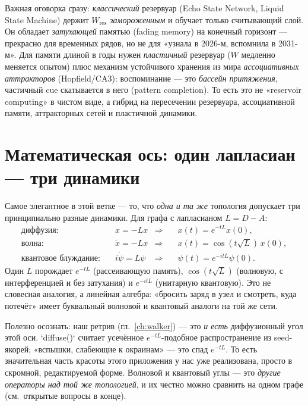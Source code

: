 Важная оговорка сразу: \emph{классический} резервуар (Echo State Network, Liquid State
Machine) держит $W_{\text{res}}$ \emph{замороженным} и обучает только считывающий слой. Он
обладает \emph{затухающей} памятью (fading memory) на конечный горизонт — прекрасно для
временных рядов, но не для «узнала в 2026-м, вспомнила в 2031-м». Для памяти длиной в годы
нужен \emph{пластичный} резервуар ($W$ медленно меняется опытом) плюс механизм устойчивого
хранения из мира \emph{ассоциативных аттракторов} (Hopfield/CA3): воспоминание — это
\emph{бассейн притяжения}, частичный cue скатывается в него (pattern completion). То есть это
не «reservoir computing» в чистом виде, а гибрид на пересечении резервуара, ассоциативной
памяти, аттракторных сетей и пластичной динамики.

\section{Математическая ось: один лапласиан — три динамики}

Самое элегантное в этой ветке — то, что \emph{одна и та же} топология допускает три
принципиально разные динамики. Для графа с лапласианом $L=D-A$:
\begin{align}
\text{диффузия:}\quad & \dot x = -Lx & \Rightarrow\quad & x(t)=e^{-tL}x(0),\\
\text{волна:}\quad & \ddot x = -Lx & \Rightarrow\quad & x(t)=\cos(t\sqrt{L})\,x(0),\\
\text{квантовое блуждание:}\quad & i\dot\psi = L\psi & \Rightarrow\quad & \psi(t)=e^{-itL}\psi(0).
\end{align}
Один $L$ порождает $e^{-tL}$ (рассеивающую память), $\cos(t\sqrt L)$ (волновую, с
интерференцией и без затухания) и $e^{-itL}$ (унитарную квантовую). Это не словесная
аналогия, а линейная алгебра: «бросить заряд в узел и смотреть, куда потечёт» имеет буквальный
волновой и квантовый аналоги на той же сети.

\begin{intuition}
Полезно осознать: наш ретрив (гл.~\ref{ch:walker}) — это \emph{и есть} диффузионный угол
этой оси. `diffuse()` считает усечённое $e^{-tL}$-подобное распространение из seed-якорей;
«вспышки, слабеющие к окраинам» — это спад $e^{-tL}$. То есть значительная часть красоты
этого приложения у нас уже реализована, просто в скромной, редактируемой форме. Волновой и
квантовый углы — это \emph{другие операторы над той же топологией}, и их честно можно
сравнить на одном графе (см.\ открытые вопросы в конце).
\end{intuition}

